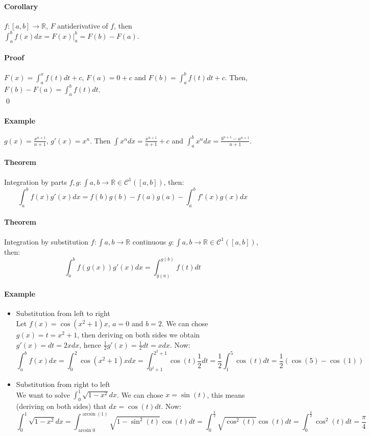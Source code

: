 \documentclass{article}
\newcommand{\functoR}[2]{#1 : #2 \rightarrow \mathbb{R}}
\newcommand{\intcc}[1]{\left[#1\right]}
\newcommand{\C}{\mathcal{C}}
\newcommand{\Theorem}{\paragraph{Theorem}}
\newcommand{\Corollary}{\paragraph{Corollary}}
\newcommand{\Proof}{\paragraph{Proof}}
\newcommand{\Example}{\paragraph{Example}}
\begin{document}
  \Corollary $\functoR{f}{\intcc{a,b}}$, $F$ antiderivative of $f$, then
  $\int_a^b f(x) dx = F(x) |_a^b = F(b) - F(a)$.

  \Proof $F(x) = \int_a^x f(t) dt + c$, $F(a) = 0 + c$ and $F(b) = \int_a^b
  f(t) dt + c$. Then, $F(b) - F(a) = \int_a^b f(t) dt$.
\\\qed

  \Example $g(x) = \frac{x^{n+1}}{n+1}$, $g'(x) = x^n$. Then $\int x^n dx =
  \frac{x^{n+1}}{n+1} + c$ and $\int_a^b x^n dx = \frac{b^{n+1} - a^{n+1}}{n+1}$.

  \Theorem Integration by parts
  $\functoR{f,g}{\int{a,b}} \in \C^1(\intcc{a,b})$, then:
  \begin{equation*}
    \int_a^b f(x) g'(x) dx = f(b)g(b) - f(a)g(a) - \int_a^b f'(x)g(x) dx
  \end{equation*}

  \Theorem Integration by substitution
  $\functoR{f}{\int{a,b}}$ continuous $\functoR{g}{\int{a,b}} \in
  \C^1(\intcc{a,b})$, then:
  \begin{equation*}
    \int_a^b f(g(x))g'(x) dx = \int_{g(a)}^{g(b)} f(t) dt
  \end{equation*}

  \Example
  \begin{itemize}
    \item Substitution from left to right
  \\Let $f(x) = \cos(x^2 + 1) x$, $a = 0$ and $b = 2$. We can chose $g(x) = t =
    x^2 + 1$, then deriving on both sides we obtain $g'(x) = dt = 2x dx$, hence
    $\frac{1}{2} g'(x) = \frac{1}{2} dt = x dx$. Now:
    \begin{equation*}
      \int_a^b f(x) dx =
      \int_0^2 \cos(x^2 + 1) x dx =
      \int_{0^2+1}^{2^2+1} \cos(t) \frac{1}{2} dt =
      \frac{1}{2} \int_1^5 \cos(t) dt =
      \frac{1}{2} \left(\cos(5) - \cos(1)\right)
    \end{equation*}

    \item Substitution from right to left
  \\We want to solve $\int_0^1 \sqrt{1-x^2}dx$. We can chose $x = \sin(t)$, this
    means (deriving on both sides) that $dx = \cos(t)dt$. Now:
    \begin{equation*}
      \int_0^1 \sqrt{1-x^2} dx =
      \int_{\arcsin{0}}^{\arcsin(1)} \sqrt{1-\sin^2(t)} \cos(t) dt =
      \int_0^{\frac{\pi}{2}} \sqrt{\cos^2(t)} \cos(t) dt =
      \int_0^{\frac{\pi}{2}} \cos^2(t) dt =
      \frac{\pi}{4}
    \end{equation*}
  \end{itemize}

\end{document}
